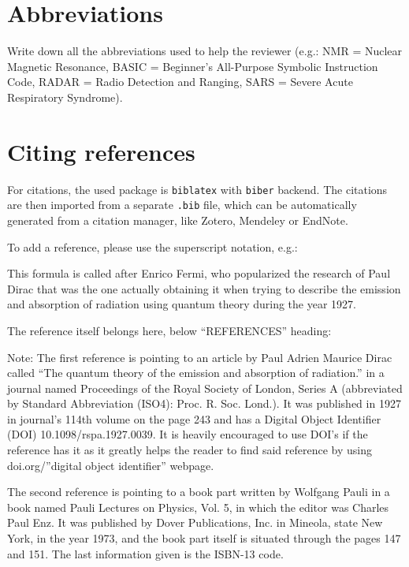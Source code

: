 \documentclass[english]{jasb}
\begin{document}
\section*{Abbreviations}
Write down all the abbreviations used to help the reviewer (e.g.: NMR = Nuclear Magnetic Resonance, BASIC = Beginner's All-Purpose Symbolic Instruction Code, RADAR = Radio Detection and Ranging, SARS = Severe Acute Respiratory Syndrome).


\section*{Citing  references}
For citations, the used package is \texttt{biblatex} with \texttt{biber} backend. The citations are then imported from a separate \texttt{.bib} file, which can be automatically generated from a citation manager, like Zotero, Mendeley or EndNote.

To add a reference, please use the superscript notation, e.g.:

This formula is called after Enrico Fermi, who popularized the research of Paul Dirac that was the one actually obtaining it when trying to describe the emission and absorption of radiation using quantum theory during the year 1927.\supercite{Dirac1927,Pauli}

The reference itself belongs here, below ``REFERENCES'' heading:


Note: The first reference is pointing to an article by Paul Adrien Maurice Dirac called ``The quantum theory of the emission and absorption of radiation.'' in a journal named Proceedings of the Royal Society of London, Series A (abbreviated by Standard Abbreviation (ISO4): Proc. R. Soc. Lond.). It was published in 1927 in journal's 114th volume on the page 243 and has a Digital Object Identifier (DOI) 10.1098/rspa.1927.0039. It is heavily encouraged to use DOI's if the reference has it as it greatly helps the reader to find said reference by using doi.org/''digital object identifier'' webpage.

The second reference is pointing to a book part written by Wolfgang Pauli in a book named Pauli Lectures on Physics, Vol. 5, in which the editor was Charles Paul Enz. It was published by Dover Publications, Inc. in Mineola, state New York, in the year 1973, and the book part itself is situated through the pages 147 and 151. The last information given is the ISBN-13 code.


\printbibliography
\end{document}
